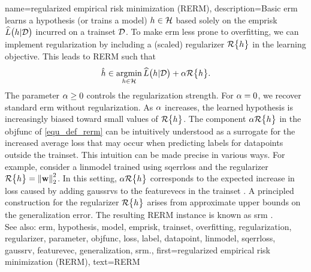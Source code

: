 {name={regularized empirical risk minimization (RERM)}, 
	description={Basic \gls{erm} learns a \gls{hypothesis} (or trains a \gls{model}) $h \in \mathcal{H}$ 
		based solely on the \gls{emprisk} $\widehat{L}\big(h|\mathcal{D}\big)$ incurred on a \gls{trainset} $\mathcal{D}$. 
		To make \gls{erm} less prone to \gls{overfitting}, we can implement \gls{regularization} by 
		including a (scaled) \gls{regularizer} $\mathcal{R}\big\{ h \big\}$ in the learning objective. 
		This leads to RERM such that
		\begin{equation}
			\label{equ_def_rerm}
			\hat{h} \in \operatorname*{argmin}_{h \in \mathcal{H}} \widehat{L}\big(h|\mathcal{D}\big) + \alpha \mathcal{R}\big\{ h \big\}.
		\end{equation}
		The \gls{parameter} $\alpha \geq 0$ controls the \gls{regularization} strength. 
		For $\alpha = 0$, we recover standard \gls{erm} without \gls{regularization}. As $\alpha$ increases, the 
		learned \gls{hypothesis} is increasingly biased toward small values of $\mathcal{R}\big\{ h \big\}$. 
		The component $\alpha \mathcal{R}\big\{ h \big\}$ in the \gls{objfunc} of \eqref{equ_def_rerm} 
		can be intuitively understood as a surrogate for the increased average \gls{loss} that may 
		occur when predicting \glspl{label} for \glspl{datapoint} outside the \gls{trainset}. This intuition  
		can be made precise in various ways. For example, consider a \gls{linmodel} trained using \gls{sqerrloss} 
		and the \gls{regularizer} $\mathcal{R}\big\{ h \big\} = \left\Vert {{\bf w}} \right\Vert_{2}^{2}$. 
		In this setting, $\alpha \mathcal{R}\big\{ h \big\}$ corresponds to the expected increase in \gls{loss} 
		caused by adding \glspl{gaussrv} to the \glspl{featurevec} in the \gls{trainset} 
		\cite[Ch. 3]{MLBasics}.
		A principled construction for the \gls{regularizer} $\mathcal{R}\big\{ h \big\}$ 
		arises from approximate upper bounds on the \gls{generalization} error. The resulting 
		RERM instance is known as \gls{srm} \cite[Sec. 7.2]{ShalevShwartz2009}.
				\\
		See also: \gls{erm}, \gls{hypothesis}, \gls{model}, \gls{emprisk}, \gls{trainset}, \gls{overfitting}, \gls{regularization}, \gls{regularizer}, \gls{parameter}, \gls{objfunc}, \gls{loss}, \gls{label}, \gls{datapoint}, \gls{linmodel}, \gls{sqerrloss}, \gls{gaussrv}, \gls{featurevec}, \gls{generalization}, \gls{srm}.}, 
	first={regularized empirical risk minimization (RERM)},
	text={RERM} 
}


